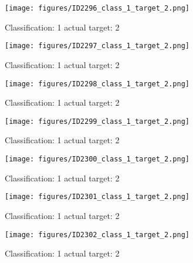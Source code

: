 \begin{figure}[h!]
\begin{center}
\texttt{[image: figures/ID2296\_class\_1\_target\_2.png]}
\end{center}
\caption{ Classification: 1 actual target: 2}
\label{fig:ID2296_class_1_target_2}
\end{figure}
\begin{figure}[h!]
\begin{center}
\texttt{[image: figures/ID2297\_class\_1\_target\_2.png]}
\end{center}
\caption{ Classification: 1 actual target: 2}
\label{fig:ID2297_class_1_target_2}
\end{figure}
\begin{figure}[h!]
\begin{center}
\texttt{[image: figures/ID2298\_class\_1\_target\_2.png]}
\end{center}
\caption{ Classification: 1 actual target: 2}
\label{fig:ID2298_class_1_target_2}
\end{figure}
\begin{figure}[h!]
\begin{center}
\texttt{[image: figures/ID2299\_class\_1\_target\_2.png]}
\end{center}
\caption{ Classification: 1 actual target: 2}
\label{fig:ID2299_class_1_target_2}
\end{figure}
\begin{figure}[h!]
\begin{center}
\texttt{[image: figures/ID2300\_class\_1\_target\_2.png]}
\end{center}
\caption{ Classification: 1 actual target: 2}
\label{fig:ID2300_class_1_target_2}
\end{figure}
\begin{figure}[h!]
\begin{center}
\texttt{[image: figures/ID2301\_class\_1\_target\_2.png]}
\end{center}
\caption{ Classification: 1 actual target: 2}
\label{fig:ID2301_class_1_target_2}
\end{figure}
\begin{figure}[h!]
\begin{center}
\texttt{[image: figures/ID2302\_class\_1\_target\_2.png]}
\end{center}
\caption{ Classification: 1 actual target: 2}
\label{fig:ID2302_class_1_target_2}
\end{figure}
